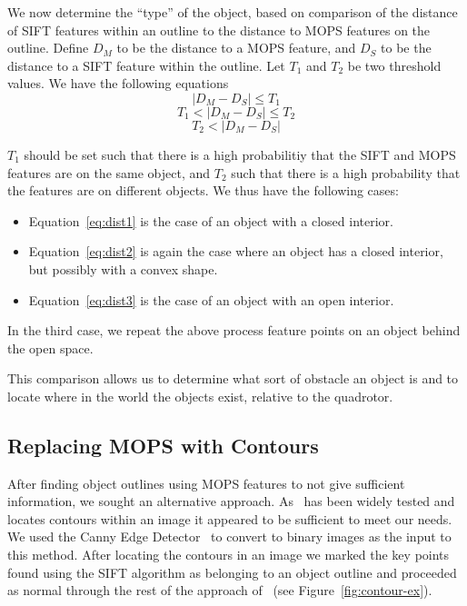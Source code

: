 \documentclass{acmsiggraph}
\begin{document}
We now determine the ``type'' of the object, based on comparison of the distance of SIFT features within an outline to the distance to MOPS features on the outline. Define $D_M$ to be the distance to a MOPS feature, and $D_S$ to be the distance to a SIFT feature within the outline. Let $T_1$ and $T_2$ be two threshold values. We have the following equations
\begin{equation}
  \label{eq:dist1}
  | D_M - D_S | \leq T_1
\end{equation}
\begin{equation}
  \label{eq:dist2}
  T_1 < | D_M - D_S | \leq T_2
\end{equation}
\begin{equation}
  \label{eq:dist3}
  T_2 < | D_M - D_S |
\end{equation}

$T_1$ should be set such that there is a high probabilitiy that the SIFT and MOPS features are on the same object, and $T_2$ such that there is a high probability that the features are on different objects. We thus have the following cases:
\begin{itemize}
\item Equation~\ref{eq:dist1} is the case of an object with a closed interior.
\item Equation~\ref{eq:dist2} is again the case where an object has a closed interior, but possibly with a convex shape.
\item Equation~\ref{eq:dist3} is the case of an object with an open interior.
\end{itemize}
In the third case, we repeat the above process feature points on an object behind the open space.

This comparison allows us to determine what sort of obstacle an object is and to locate where in the world the objects exist, relative to the quadrotor.

\subsection{Replacing MOPS with Contours}
After finding object outlines using MOPS features to not give sufficient information, we sought an 
alternative approach.  As~\cite{suzuki1985} has been widely tested and locates contours within an image it appeared to be 
sufficient to meet our needs. We used the Canny Edge Detector~\cite{canny1986} to convert to binary images as the input to
this method.  After locating the contours in an image we marked the key points found using the SIFT algorithm as 
belonging to an object outline and proceeded as normal through the rest of the approach of~\cite{lee2011} (see Figure~\ref{fig:contour-ex}).
\end{document}
